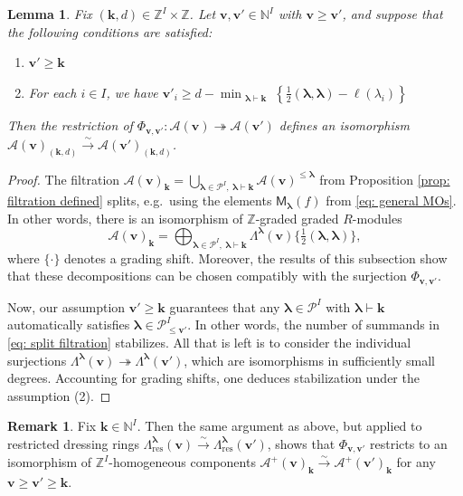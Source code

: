 \documentclass[11pt,reqno]{amsart}
\renewcommand{\mathbf}{\mathbold}
\numberwithin{equation}{section}
\newtheorem{Lemma}[equation]{Lemma}
\theoremstyle{definition}
\newtheorem{Remark}[equation]{Remark}
\newcommand{\cA}{\mathcal{A}}
\newcommand{\cP}{\mathcal{P}}
\newcommand{\bk}{\mathbf{k}}
\newcommand{\bv}{\mathbf{v}}
\newcommand{\NN}{\mathbb{N}}
\newcommand{\ZZ}{\mathbb{Z}}
\renewcommand{\bv}{\mathbf{v}} %
\newcommand{\M}{\mathsf{M}}
\newcommand{\vertexset}{I}
\newcommand{\GT}{\Lambda}
\newcommand{\base}{R}
\newcommand{\Partitions}{\cP}
\newcommand{\la}{\lambda}
\newcommand{\bla}{{\boldsymbol{\lambda}}}
\newcommand{\qzast}{\cA}
\newcommand{\qzastplus}{\cA^{+}}
\newcommand{\res}{\mathrm{res}}
\begin{document}
\begin{Lemma}
    \label{lem:stabilization}
    Fix $(\bk, d) \in \ZZ^\vertexset\times \ZZ$. Let  $\bv, \bv' \in \NN^\vertexset$ with $\bv \geq \bv'$, and suppose that the following conditions are satisfied:
    \begin{enumerate}
        \item $\bv' \geq \bk$
        \item For each $i\in \vertexset$, we have $\bv'_i \geq d - \displaystyle{\min_{\substack{\bla \vdash \bk}} \left\{ \tfrac{1}{2}(\bla, \bla) - \ell(\la_i) \right\}}$
    \end{enumerate}
    Then the restriction of $\Phi_{\bv,\bv'} : \qzast(\bv) \twoheadrightarrow \qzast(\bv')$  defines an isomorphism $\qzast(\bv)_{(\bk, d)} \xrightarrow{\sim } \qzast(\bv')_{(\bk,d)}
    $.
\end{Lemma}
\begin{proof}

    The filtration $\qzast(\bv)_\bk = \bigcup_{\bla \in \Partitions^\vertexset, ~ \bla \vdash \bk} \qzast(\bv)^{\leq \bla}$ from Proposition \ref{prop: filtration defined} splits, e.g.~using the elements $\M_\bla(f)$ from \eqref{eq: general MOs}. In other words, there is an isomorphism of $\ZZ$-graded graded $\base$-modules
    \begin{equation}
        \label{eq: split filtration}
        \qzast(\bv)_\bk = \bigoplus_{\bla \in \Partitions^\vertexset, ~ \bla \vdash \bk} \GT^\bla(\bv)\{\tfrac{1}{2} (\bla,\bla)\},
    \end{equation}
    where $\{\cdot\}$ denotes a grading shift. 
    Moreover, the results of this subsection show that these decompositions can be chosen compatibly with the surjection $\Phi_{\bv,\bv'}$.

    Now, our assumption $\bv' \geq \bk$ guarantees that any $\bla \in \Partitions^\vertexset$ with $\bla \vdash \bk$ automatically satisfies $\bla \in \Partitions^\vertexset_{\leq \bv'}$.  In other words, the number of summands in \eqref{eq: split filtration} stabilizes.   All that is left is to consider the individual surjections $\GT^\bla(\bv) \twoheadrightarrow \GT^\bla(\bv')$, which are  isomorphisms in sufficiently small degrees. Accounting for grading shifts, one deduces stabilization under the assumption (2).
\end{proof}

\begin{Remark}
    \label{rem:stabilization}
    Fix $\bk \in \NN^\vertexset$. Then the same argument as above, but applied to restricted dressing rings $\GT^\bla_\res(\bv) \xrightarrow{\sim} \GT^\bla_\res(\bv')$, shows that $\Phi_{\bv,\bv'} $ restricts to an isomorphism of $\ZZ^\vertexset$-homogeneous components ${\qzastplus(\bv)_\bk \xrightarrow{\sim} \qzastplus(\bv')_\bk}$ for any  $\bv \geq \bv' \geq \bk$.
\end{Remark}
\end{document}
